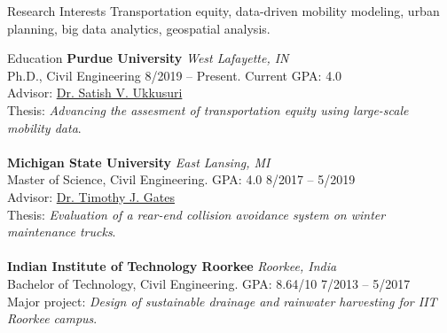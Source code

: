 \documentclass{CV} %
\begin{document}
\begin{rSection}{Research Interests}
    Transportation equity, data-driven mobility modeling, urban planning, big data analytics, geospatial analysis.
\end{rSection}

\begin{rSection}{Education}
    {\bf Purdue University} \hfill {\em West Lafayette, IN} 
    \\ Ph.D., Civil Engineering \hfill {8/2019 – Present}. Current GPA: 4.0
    \\ Advisor: \href{http://www.satishukkusuri.com/}{Dr. Satish V. Ukkusuri}
    \\ Thesis: \emph{Advancing the assesment of transportation equity using large-scale mobility data}. \\
    \\ {\bf Michigan State University} \hfill {\em East Lansing, MI} 
    \\ Master of Science, Civil Engineering. GPA: 4.0 \hfill {8/2017 – 5/2019}
    \\ Advisor: \href{https://www.egr.msu.edu/people/profile/gatestim}{Dr. Timothy J. Gates}
    \\ Thesis: \emph{Evaluation of a rear-end collision avoidance system on winter maintenance trucks}. \\
    \\ {\bf Indian Institute of Technology Roorkee} \hfill {\em Roorkee, India}
    \\ Bachelor of Technology, Civil Engineering. GPA: 8.64/10 \hfill {7/2013 – 5/2017}
    \\ Major project: \emph{Design of sustainable drainage and rainwater harvesting for IIT Roorkee campus}.
\end{rSection}
\end{document}
